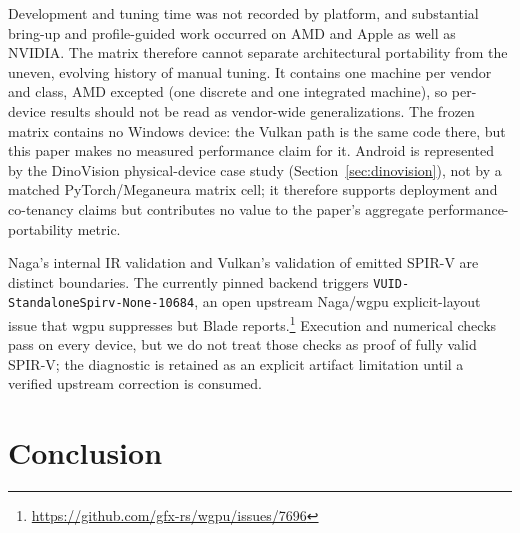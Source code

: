 \documentclass[10pt,twocolumn]{article}
\newcommand{\system}{Meganeura}
\newcommand{\code}[1]{\texttt{#1}}
\begin{document}
Development and tuning time was not recorded by platform, and substantial
bring-up and profile-guided work occurred on AMD and Apple as well as NVIDIA.
The matrix therefore cannot separate architectural portability from the
uneven, evolving history of manual tuning. It contains one machine per
vendor and class, AMD excepted (one discrete and one integrated machine),
so per-device results should not be read as vendor-wide generalizations. The
frozen matrix contains no Windows device: the Vulkan path is the same code
there, but this paper makes no measured performance claim for it. Android is
represented by the DinoVision physical-device case study
(Section~\ref{sec:dinovision}), not by a matched PyTorch/\system{} matrix
cell; it therefore supports deployment and co-tenancy claims but contributes
no value to the paper's aggregate performance-portability metric.

Naga's internal IR validation and Vulkan's validation of emitted SPIR-V are
distinct boundaries. The currently pinned backend triggers
\code{VUID-StandaloneSpirv-None-10684}, an open upstream Naga/wgpu
explicit-layout issue that wgpu suppresses but Blade reports.\footnote{
\url{https://github.com/gfx-rs/wgpu/issues/7696}} Execution and numerical
checks pass on every device, but we do not treat those checks as proof of
fully valid SPIR-V; the diagnostic is retained as an explicit artifact
limitation until a verified upstream correction is consumed.

\section{Conclusion}
\end{document}
